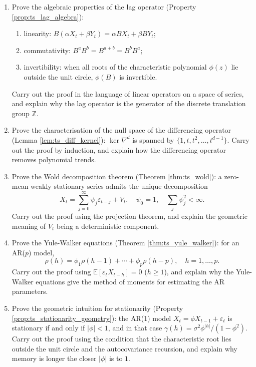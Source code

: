 \begin{enumerate}[leftmargin=3em, label=\textbf{Exercise \arabic*}]
    \item Prove the algebraic properties of the lag operator (Property \ref{prop:ts_lag_algebra}):
    \begin{enumerate}[label=(\roman*)]
        \item linearity: $B(\alpha X_t+\beta Y_t)=\alpha BX_t+\beta BY_t$;
        \item commutativity: $B^aB^b=B^{a+b}=B^bB^a$;
        \item invertibility: when all roots of the characteristic polynomial $\phi(z)$ lie outside the unit circle, $\phi(B)$ is invertible.
    \end{enumerate}
    Carry out the proof in the language of linear operators on a space of series,
    and explain why the lag operator is the generator of the discrete translation group $\mathbb{Z}$.

    \item Prove the characterisation of the null space of the differencing operator (Lemma \ref{lem:ts_diff_kernel}):
    $\ker\nabla^d$ is spanned by $\{1,t,t^2,\dots,t^{d-1}\}$.
    Carry out the proof by induction, and explain how the differencing operator removes polynomial trends.

    \item Prove the Wold decomposition theorem (Theorem \ref{thm:ts_wold}):
    a zero-mean weakly stationary series admits the unique decomposition
    \[
    X_t=\sum_{j=0}^\infty\psi_j\varepsilon_{t-j}+V_t,\quad
    \psi_0=1,\quad\sum_j\psi_j^2<\infty.
    \]
    Carry out the proof using the projection theorem,
    and explain the geometric meaning of $V_t$ being a deterministic component.

    \item Prove the Yule-Walker equations (Theorem \ref{thm:ts_yule_walker}):
    for an AR($p$) model,
    \[
    \rho(h)=\phi_1\rho(h-1)+\cdots+\phi_p\rho(h-p),\quad h=1,\dots,p.
    \]
    Carry out the proof using $\mathbb{E}[\varepsilon_tX_{t-h}]=0$ ($h\ge1$),
    and explain why the Yule-Walker equations give the method of moments for estimating the AR parameters.

    \item Prove the geometric intuition for stationarity (Property \ref{prop:ts_stationarity_geometry}):
    the AR(1) model $X_t=\phi X_{t-1}+\varepsilon_t$ is stationary if and only if $|\phi|<1$,
    and in that case $\gamma(h)=\sigma^2\phi^{|h|}/(1-\phi^2)$.
    Carry out the proof using the condition that the characteristic root lies outside the unit circle and the autocovariance recursion,
    and explain why memory is longer the closer $|\phi|$ is to $1$.


\end{enumerate}
